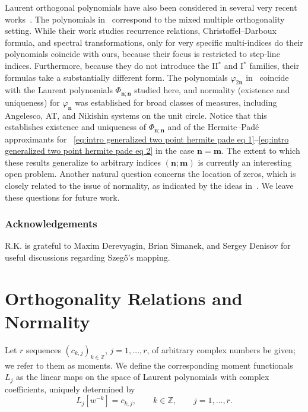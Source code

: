 \documentclass[reqno,centertags,11pt,draft]{amsart}
\newcommand{\Z}{\mathbb{Z}}
\begin{document}
Laurent orthogonal polynomials have also been considered in several very recent works~\cites{KVMLOPUC1,KNik,HueMan}. 
The polynomials in~\cite{HueMan} correspond to the mixed multiple orthogonality setting. While their work studies recurrence relations, Christoffel--Darboux formula, and spectral transformations, only for very specific multi-indices do their polynomials coincide with ours, because their focus is restricted to step-line indices. Furthermore, because they do not introduce the II${}^*$ and I${}^*$ families, their formulas take a substantially different form.
The polynomials $\varphi_{2\bm{n}}$ in~\cite{KVMLOPUC1,KNik} coincide with the Laurent polynomials $\Phi_{\bm{n};\bm{n}}$ studied here, and normality (existence and uniqueness) for $\varphi_{\bm{n}}$ was established for broad classes of measures, including Angelesco, AT, and Nikishin systems on the unit circle. Notice that this establishes existence and uniqueness of $\Phi_{\bm{n};\bm{n}}$ and of the Hermite--Pad\'{e} approximants for ~\eqref{eq:intro generalized two point hermite pade eq 1}--\eqref{eq:intro generalized two point hermite pade eq 2} in the case $\bm{n}=\bm{m}$. The extent to which these results generalize to arbitrary indices $(\bm{n};\bm{m})$ is currently an interesting open problem. Another natural question concerns the location of zeros, which is closely related to the issue of normality, as indicated by the ideas in~\cite{KVInterlacing}. We leave these questions for future work.

\subsubsection*{Acknowledgements}
R.K. is grateful to  Maxim Derevyagin, Brian Simanek, and Sergey Denisov for useful discussions regarding Szeg\H{o}'s mapping. 


\section{Orthogonality Relations and Normality}\label{ss:normality}

Let $r$ sequences $(c_{k,j})_{k\in\Z}$, $j=1,\ldots,r$, of arbitrary complex numbers be given; we refer to them as moments. We define the corresponding moment functionals $L_j$ as the linear maps on the space of Laurent polynomials with complex coefficients, uniquely determined by
\begin{equation}\label{eq:moments linear functional}
         L_j[w^{-k}] = c_{k,j} , \qquad k\in\Z, \qquad j = 1,\dots,r. 
    \end{equation}
\end{document}
